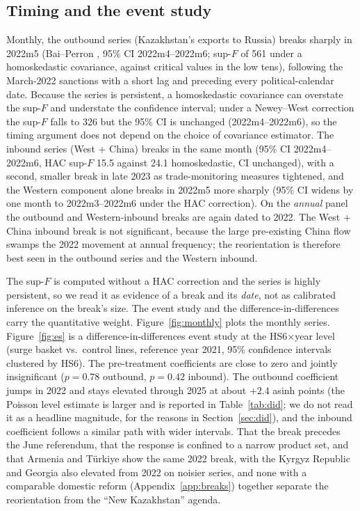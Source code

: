 \documentclass[12pt]{article}
\begin{document}
\subsection{Timing and the event study}

Monthly, the outbound series (Kazakhstan's exports to Russia) breaks sharply in 2022m5
(Bai--Perron \citep{baiperron1998}, 95\% CI 2022m4--2022m6; sup-$F$ \citep{andrews1993} of 561 under a homoskedastic covariance, against
critical values in the low tens), following the March-2022 sanctions with a short lag and
preceding every political-calendar date. Because the series is persistent, a homoskedastic
covariance can overstate the sup-$F$ and understate the confidence interval; under a
Newey--West \citep{neweywest1987} correction the sup-$F$ falls to 326 but the 95\% CI is unchanged (2022m4--2022m6),
so the timing argument does not depend on the choice of covariance estimator. The inbound
series (West + China) breaks in the same
month (95\% CI 2022m4--2022m6, HAC sup-$F$ 15.5 against 24.1 homoskedastic, CI unchanged), with
a second, smaller break in late 2023 as trade-monitoring
measures tightened, and the Western component alone breaks in 2022m5 more sharply (95\% CI
widens by one month to 2022m3--2022m6 under the HAC correction). On the
\emph{annual} panel the outbound and Western-inbound breaks are again dated to 2022. The
West + China inbound break is not significant, because the large pre-existing China flow swamps
the 2022 movement at annual frequency; the reorientation is therefore best seen
in the outbound series and the Western inbound.

The sup-$F$ is computed without a HAC correction and the series is highly persistent, so we
read it as evidence of a break and its \emph{date}, not as calibrated inference on the
break's size. The event study and the difference-in-differences carry the quantitative
weight. Figure~\ref{fig:monthly} plots the monthly series. Figure~\ref{fig:es} is a
difference-in-differences event study at the HS6$\times$year level
(surge basket vs.\ control lines, reference year 2021, 95\% confidence intervals clustered by
HS6). The pre-treatment coefficients are close to zero and jointly insignificant ($p = 0.78$
outbound, $p = 0.42$ inbound). The outbound coefficient jumps in 2022 and stays elevated
through 2025 at about $+2.4$ asinh points (the Poisson level estimate is larger and is
reported in Table~\ref{tab:did}; we do not read it as a headline magnitude, for the reasons in
Section~\ref{sec:did}), and the inbound coefficient follows a similar path with wider
intervals. That the break precedes the June
referendum, that the response is confined to a narrow product set, and that Armenia and
T\"urkiye show the same 2022 break, with the Kyrgyz Republic and Georgia also elevated from
2022 on noisier series, and none with a comparable domestic reform (Appendix~\ref{app:breaks})
together separate the reorientation from the ``New Kazakhstan'' agenda.
\end{document}

